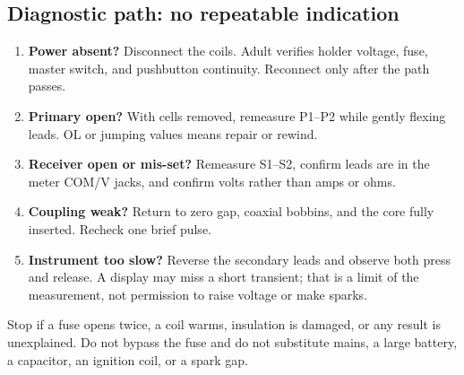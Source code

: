 {\subsection{Diagnostic path: no repeatable indication}
\begin{enumerate}
\item \textbf{Power absent?} Disconnect the coils. Adult verifies holder
voltage, fuse, master switch, and pushbutton continuity. Reconnect only after
the path passes.
\item \textbf{Primary open?} With cells removed, remeasure P1--P2 while gently
flexing leads. OL or jumping values means repair or rewind.
\item \textbf{Receiver open or mis-set?} Remeasure S1--S2, confirm leads are in
the meter COM/V jacks, and confirm volts rather than amps or ohms.
\item \textbf{Coupling weak?} Return to zero gap, coaxial bobbins, and the core
fully inserted. Recheck one brief pulse.
\item \textbf{Instrument too slow?} Reverse the secondary leads and observe
both press and release. A display may miss a short transient; that is a limit
of the measurement, not permission to raise voltage or make sparks.
\end{enumerate}
Stop if a fuse opens twice, a coil warms, insulation is damaged, or any result
is unexplained. Do not bypass the fuse and do not substitute mains, a large
battery, a capacitor, an ignition coil, or a spark gap.}

\def\explanation{This instrument combines current-produced field, changing
flux, mutual induction, and geometry. The secondary responds while primary
current changes---at press and release---not simply because DC exists. Alignment,
small gap, a shared magnetic core, and turn count affect linked flux. The
instrument deliberately does not make sparks and is not a Tesla coil. A
repeatable low-energy pulse and an honest record provide better evidence than
an uncontrolled high-voltage spectacle.}

